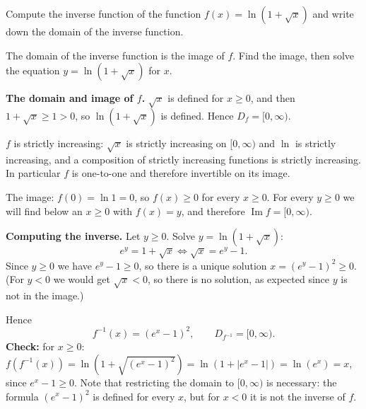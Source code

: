 
\begin{question}
Compute the inverse function of the function $f(x)=\ln(1+\sqrt{x})$ and write down the domain of the inverse function.
\end{question}

\begin{hint}
The domain of the inverse function is the image of $f$. Find the image, then solve the equation $y=\ln(1+\sqrt x)$ for $x$.
\end{hint}

\begin{solution}
\textbf{The domain and image of $f$.} $\sqrt x$ is defined for $x\ge0$, and then $1+\sqrt x\ge1>0$, so $\ln(1+\sqrt x)$ is defined. Hence $D_f=[0,\infty)$.

$f$ is strictly increasing: $\sqrt x$ is strictly increasing on $[0,\infty)$ and $\ln$ is strictly increasing, and a composition of strictly increasing functions is strictly increasing. In particular $f$ is one-to-one and therefore invertible on its image.

The image: $f(0)=\ln 1=0$, so $f(x)\ge0$ for every $x\ge0$. For every $y\ge0$ we will find below an $x\ge0$ with $f(x)=y$, and therefore $\operatorname{Im}f=[0,\infty)$.

\textbf{Computing the inverse.} Let $y\ge0$. Solve $y=\ln(1+\sqrt x)$:
\[
e^y=1+\sqrt x\iff \sqrt x=e^y-1 .
\]
Since $y\ge0$ we have $e^y-1\ge0$, so there is a unique solution $x=(e^y-1)^2\ge0$. (For $y<0$ we would get $\sqrt x<0$, so there is no solution, as expected since $y$ is not in the image.)

Hence
\[
\boxed{f^{-1}(x)=\left(e^x-1\right)^2,\qquad D_{f^{-1}}=[0,\infty).}
\]
\textbf{Check:} for $x\ge0$: $f(f^{-1}(x))=\ln\left(1+\sqrt{(e^x-1)^2}\right)=\ln\left(1+|e^x-1|\right)=\ln(e^x)=x$, since $e^x-1\ge0$. Note that restricting the domain to $[0,\infty)$ is necessary: the formula $(e^x-1)^2$ is defined for every $x$, but for $x<0$ it is not the inverse of $f$.
\end{solution}
